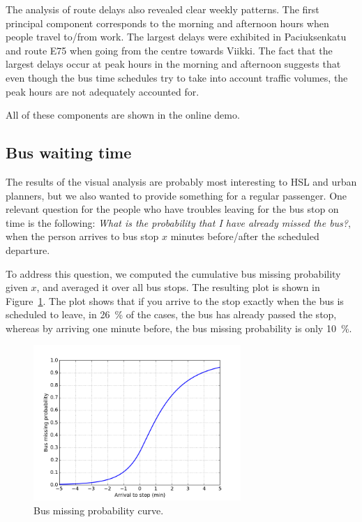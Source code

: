 \documentclass[a4paper,12pt]{article}
\begin{document}
The analysis of route delays also revealed clear weekly patterns. The first 
principal component corresponds to the morning and afternoon hours when people 
travel to/from work. The largest delays were exhibited in Paciuksenkatu and 
route E75 when going from the centre towards Viikki. The fact that the largest 
delays occur at peak hours in the morning and afternoon suggests that 
even though the bus time schedules try to take into account traffic volumes, 
the peak hours are not adequately accounted for.

All of these components are shown in the online demo.

\subsection{Bus waiting time}

The results of the visual analysis are probably most interesting to HSL and 
urban planners, but we also wanted to provide something for a regular 
passenger. One relevant question for the people who have troubles leaving for 
the bus stop on time is the following: \emph{What is the probability that I 
have already missed the bus?}, when the person arrives to bus stop $x$ minutes 
before/after the scheduled departure.

To address this question, we computed the cumulative bus missing probability 
given $x$, and averaged it over all bus stops. The resulting plot is shown in 
Figure~\ref{fig:miss_prob}. The plot shows that if you arrive to the stop 
exactly when the bus is scheduled to leave, in 26~\% of the cases, the bus has 
already passed the stop, whereas by arriving one minute before, the bus 
missing probability is only 10~\%.

\begin{figure}
\centering
\includegraphics[width=0.7\textwidth]{bus_missing_prob.png}
\caption{Bus missing probability curve.}
\label{fig:miss_prob}
\end{figure}
\end{document}
